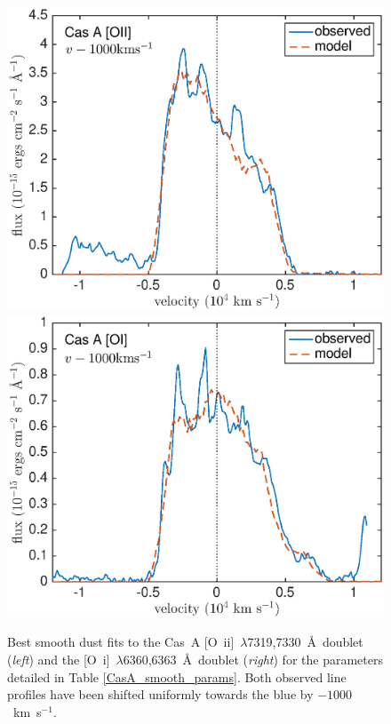 \begin{figure}
\centering
\includegraphics[scale=0.41,clip=true, trim=15 0 40 20]{chapters/chapter6/figs/CasA/CasA_shifted1000_OII}
\includegraphics[scale=0.41,clip=true, trim=15 0 40 20]{chapters/chapter6/figs/CasA/CasA_OI_shifted1000}
\caption{Best smooth dust fits to the Cas~A [O~{\sc ii}]~$\lambda$7319,7330~\AA\  doublet ({\em left}) and the [O~{\sc i}]~$\lambda$6360,6363~\AA\  doublet ({\em right}) for the parameters detailed in Table \ref{CasA_smooth_params}.  Both observed line profiles have been shifted uniformly towards the blue by $-1000$~km~s$^{-1}$.}
\label{CasA_OI_OII}
\end{figure}

